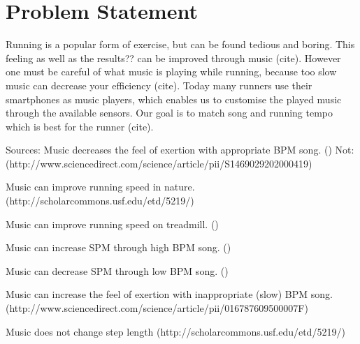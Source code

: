 \section{Problem Statement}
Running is a popular form of exercise, but can be found tedious and boring. This feeling as well as the results?? can be improved through music (cite). However one must be careful of what music is playing while running, because too slow music can decrease your efficiency (cite). Today many runners use their smartphones as music players, which enables us to customise the played music through the available sensors.
Our goal is to match song and running tempo which is best for the runner (cite).


Sources:
Music decreases the feel of exertion with appropriate BPM song. ()
Not: (http://www.sciencedirect.com/science/article/pii/S1469029202000419)

Music can improve running speed in nature. (http://scholarcommons.usf.edu/etd/5219/) 

Music can improve running speed on treadmill. ()

Music can increase SPM through high BPM song. ()

Music can decrease SPM through low BPM song. ()

Music can increase the feel of exertion with inappropriate (slow) BPM song. (http://www.sciencedirect.com/science/article/pii/016787609500007F)


Music does not change step length (http://scholarcommons.usf.edu/etd/5219/)

